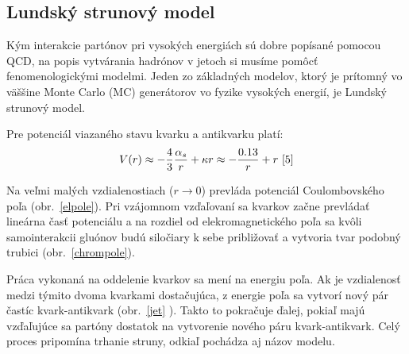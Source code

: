 \documentclass[thesismargins, thesislinespacing]{rnthesis}
\begin{document}
\subsection{Lundský strunový model}
Kým interakcie partónov pri vysokých energiách sú dobre popísané pomocou QCD, na popis vytvárania hadrónov v jetoch si musíme pomôcť fenomenologickými \-mo\-del\-mi. Jeden zo základných modelov, ktorý je prítomný vo väššine Monte Carlo (MC) generátorov vo fyzike vysokých energií, je Lundský strunový model.

Pre potenciál viazaného stavu kvarku a antikvarku platí:
\begin{equation}
	V(r) \approx - \frac{4}{3} \frac{\alpha_s}{r} + \kappa r \approx - \frac{0.13}{r} + r~\cite{5}
\end{equation}

Na veľmi malých vzdialenostiach ($r\rightarrow0$) prevláda potenciál Coulombovského poľa (obr.~\ref{elpole}). Pri vzájomnom vzďaľovaní sa kvarkov začne prevládať lineárna časť potenciálu a na rozdiel od elekromagnetického poľa sa kvôli samointerakcii gluónov budú siločiary k sebe približovať a vytvoria tvar podobný trubici (obr.~\ref{chrompole}).

Práca vykonaná na oddelenie kvarkov sa mení na energiu poľa. Ak je vzdialenosť medzi týmito dvoma kvarkami dostačujúca, z energie poľa sa vytvorí nový pár častíc kvark-antikvark (obr.~\ref{jet} ). Takto to pokračuje ďalej, pokiaľ majú vzďaľujúce sa partóny dostatok na vytvorenie nového páru kvark-antikvark. Celý proces pripomína trhanie struny, odkiaľ pochádza aj názov modelu.
\end{document}
